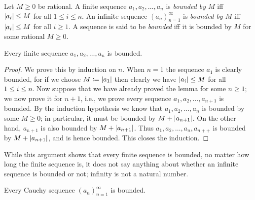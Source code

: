 \begin{definition}\label{5.1.12}
    Let \(M \geq 0\) be rational.
    A finite sequence \(a_1, a_2, \dots, a_n\) is \emph{bounded by \(M\)} iff \(\abs*{a_i} \leq M\) for all \(1 \leq i \leq n\).
    An infinite sequence \((a_n)_{n = 1}^{\infty}\) is \emph{bounded by \(M\)} iff \(\abs*{a_i} \leq M\) for all \(i \geq 1\).
    A sequence is said to be \emph{bounded} iff it is bounded by \(M\) for some rational \(M \geq 0\).
\end{definition}

\setcounter{theorem}{13}
\begin{lemma}\label{5.1.14}
    Every finite sequence \(a_1, a_2, \dots, a_n\) is bounded.
\end{lemma}

\begin{proof}
    We prove this by induction on \(n\).
    When \(n = 1\) the sequence \(a_1\) is clearly bounded, for if we choose \(M \coloneqq \abs*{a_1}\) then clearly we have \(\abs*{a_i} \leq M\) for all \(1 \leq i \leq n\).
    Now suppose that we have already proved the lemma for some \(n \geq 1\);
    we now prove it for \(n + 1\), i.e., we prove every sequence \(a_1, a_2, \dots, a_{n + 1}\) is bounded.
    By the induction hypothesis we know that \(a_1, a_2, \dots, a_n\) is bounded by some \(M \geq 0\);
    in particular, it must be bounded by \(M + \abs*{a_{n + 1}}\).
    On the other hand, \(a_{n + 1}\) is also bounded by \(M + \abs*{a_{n + 1}}\).
    Thus \(a_1, a_2, \dots, a_n, a_{n++}\) is bounded by \(M + \abs*{a_{n + 1}}\), and is hence bounded.
    This closes the induction.
\end{proof}

\begin{note}
    While this argument shows that every finite sequence is bounded, no matter how long the finite sequence is, it does not say anything about whether an infinite sequence is bounded or not;
    infinity is not a natural number.
\end{note}

\begin{lemma}\label{5.1.15}
    Every Cauchy sequence \((a_n)_{n = 1}^{\infty}\) is bounded.
\end{lemma}

